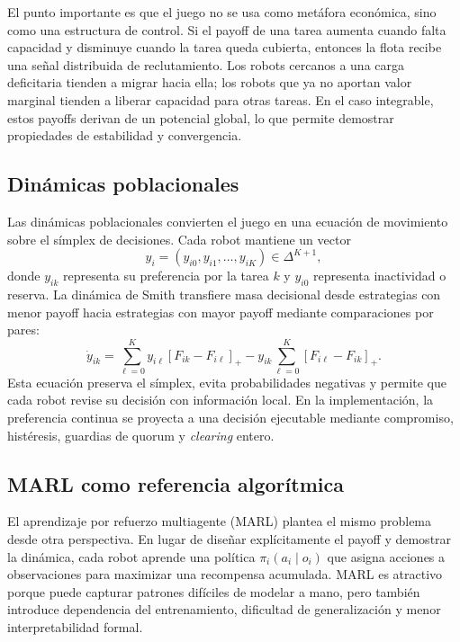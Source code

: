 El punto importante es que el juego no se usa como metáfora económica, sino como una
estructura de control. Si el payoff de una tarea aumenta cuando falta capacidad y
disminuye cuando la tarea queda cubierta, entonces la flota recibe una señal distribuida
de reclutamiento. Los robots cercanos a una carga deficitaria tienden a migrar hacia
ella; los robots que ya no aportan valor marginal tienden a liberar capacidad para otras
tareas. En el caso integrable, estos payoffs derivan de un potencial global, lo que
permite demostrar propiedades de estabilidad y convergencia.

\subsection*{Dinámicas poblacionales}

Las dinámicas poblacionales convierten el juego en una ecuación de movimiento sobre el
símplex de decisiones. Cada robot mantiene un vector
\[
  y_i=(y_{i0},y_{i1},\ldots,y_{iK})\in\Delta^{K+1},
\]
donde $y_{ik}$ representa su preferencia por la tarea $k$ y $y_{i0}$ representa
inactividad o reserva. La dinámica de Smith transfiere masa decisional desde estrategias
con menor payoff hacia estrategias con mayor payoff mediante comparaciones por pares:
\[
  \dot y_{ik}
  =
  \sum_{\ell=0}^{K} y_{i\ell}[F_{ik}-F_{i\ell}]_+
  -
  y_{ik}\sum_{\ell=0}^{K}[F_{i\ell}-F_{ik}]_+.
\]
Esta ecuación preserva el símplex, evita probabilidades negativas y permite que cada
robot revise su decisión con información local. En la implementación, la preferencia
continua se proyecta a una decisión ejecutable mediante compromiso, histéresis, guardias
de quorum y \emph{clearing} entero.

\subsection*{MARL como referencia algorítmica}

El aprendizaje por refuerzo multiagente (MARL) plantea el mismo problema desde otra
perspectiva. En lugar de diseñar explícitamente el payoff y demostrar la dinámica, cada
robot aprende una política $\pi_i(a_i\mid o_i)$ que asigna acciones a observaciones para
maximizar una recompensa acumulada. MARL es atractivo porque puede capturar patrones
difíciles de modelar a mano, pero también introduce dependencia del entrenamiento,
dificultad de generalización y menor interpretabilidad formal.

